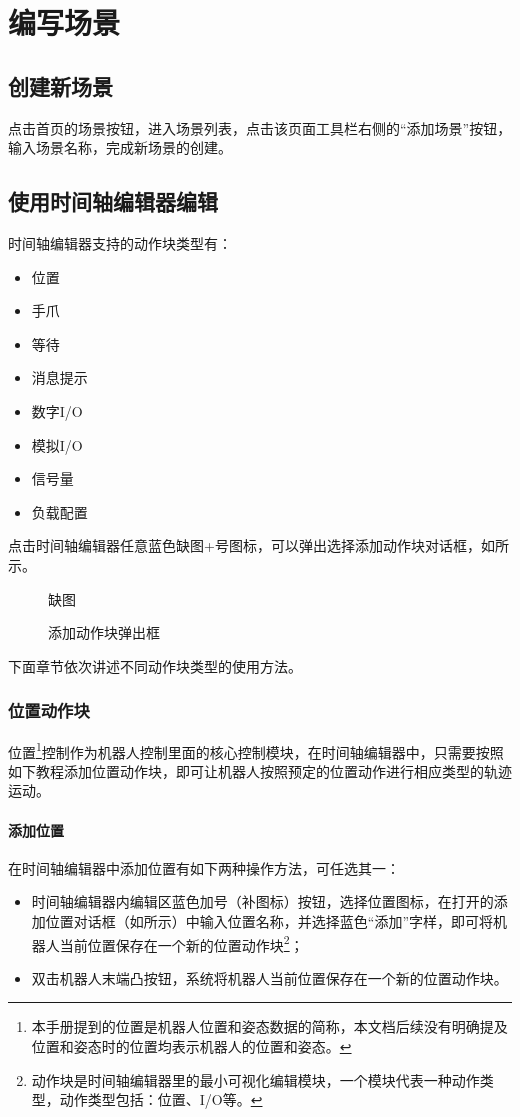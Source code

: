 
\section{编写场景}
\subsection{创建新场景}
点击\LM 首页的场景按钮，进入场景列表，点击该页面工具栏右侧的“添加场景”按钮，输入场景名称，完成新场景的创建。

\subsection{使用时间轴编辑器编辑}
时间轴编辑器支持的动作块类型有：
\begin{itemize}
\item 位置
\item 手爪
\item 等待
\item 消息提示
\item 数字I/O
\item 模拟I/O
\item 信号量
\item 负载配置
\end{itemize}

点击时间轴编辑器任意蓝色{\color{red}缺图+}号图标，可以弹出选择添加动作块对话框，如所示。

\begin{figure}[ht]
	\centering
	\color{red}缺图
	\caption{添加动作块弹出框}
	\label{fig:添加动作块弹出框}
\end{figure}

下面章节依次讲述不同动作块类型的使用方法。
\subsubsection{位置动作块}
位置\footnote{本手册提到的位置是机器人位置和姿态数据的简称，本文档后续没有明确提及位置和姿态时的位置均表示机器人的位置和姿态。}控制作为机器人控制里面的核心控制模块，在时间轴编辑器中，只需要按照如下教程添加位置动作块，即可让机器人按照预定的位置动作进行相应类型的轨迹运动。
\paragraph{添加位置}
在时间轴编辑器中添加位置有如下两种操作方法，可任选其一：
\begin{itemize}
	\item 时间轴编辑器内编辑区蓝色加号{\color{red}（补图标）}按钮，选择位置图标，在打开的添加位置对话框（如所示）中输入位置名称，并选择蓝色“添加”字样，即可将机器人当前位置保存在一个新的位置动作块\footnote{动作块是时间轴编辑器里的最小可视化编辑模块，一个模块代表一种动作类型，动作类型包括：位置、I/O等。}；
	\item 双击机器人末端凸按钮，系统将机器人当前位置保存在一个新的位置动作块。
\end{itemize}

